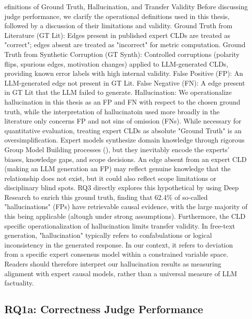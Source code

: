 efinitions of Ground Truth, Hallucination, and Transfer Validity
Before discussing judge performance, we clarify the operational definitions used in this thesis, followed by a discussion of their limitations and validity.
Ground Truth from Literature (GT Lit): Edges present in published expert CLDs are treated as "correct"; edges absent are treated as "incorrect" for metric computation.
Ground Truth from Synthetic Corruption (GT Synth): Controlled corruptions (polarity flips, spurious edges, motivation changes) applied to LLM-generated CLDs, providing known error labels with high internal validity.
False Positive (FP): An LLM-generated edge not present in GT Lit.
False Negative (FN): A edge present in GT Lit that the LLM failed to generate.
Hallucination: We operationalize hallucination in this thesis as an FP and FN with respect to the chosen ground truth, while the interpretation of hallucinatoin used more broadly in the literature only concerns FP and not sins of omission (FNs).
While necessary for quantitative evaluation, treating expert CLDs as absolute "Ground Truth" is an oversimplification. Expert models synthesize domain knowledge through rigorous Group Model Building processes (\cite{crielaard2024refining}), but they inevitably encode the experts' biases, knowledge gaps, and scope decisions. An edge absent from an expert CLD (making an LLM generation an FP) may reflect genuine knowledge that the relationship does not exist, but it could also reflect scope limitations or disciplinary blind spots. RQ3 directly explores this hypothetical by using Deep Research to enrich this ground truth, finding that 62.4\% of so-called "hallucinations" (FPs) have retrievable causal evidence, with the large majority of this being applicable (altough under strong assumptions).
Furthermore, the CLD specific operationalization of hallucination limits transfer validity. In free-text generation, "hallucination" typically refers to confabulations or logical inconsistency in the generated response. In our context, it refers to deviation from a specific expert consensus model within a constrained variable space. Readers should therefore interpret our hallucination results as measuring alignment with expert causal models, rather than a universal measure of LLM factuality.


\subsection{RQ1a: Correctness Judge Performance}
\label{sec:discussion_rq1a_correctness}

